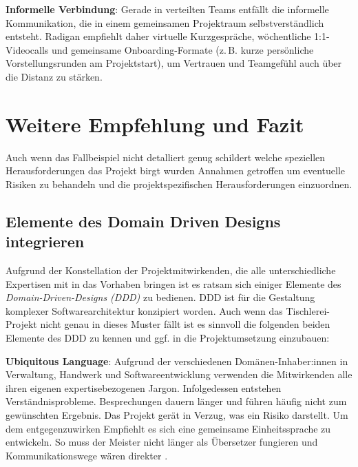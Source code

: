 \documentclass[
    a4paper,
    11pt,
    bibliography=totoc,
    listof=totoc,
    parskip=half,
    headings=normal
]{scrbook}
\begin{document}
\textbf{Informelle Verbindung}: Gerade in verteilten Teams entfällt die
informelle Kommunikation, die in einem gemeinsamen Projektraum selbstverständlich
entsteht. Radigan\autocite{Radigan2023} empfiehlt daher virtuelle Kurzgespräche,
wöchentliche 1:1-Videocalls und gemeinsame Onboarding-Formate (z.\,B. kurze
persönliche Vorstellungsrunden am Projektstart), um Vertrauen und Teamgefühl
auch über die Distanz zu stärken.

\chapter{Weitere Empfehlung und Fazit}


Auch wenn das Fallbeispiel nicht detalliert genug schildert welche speziellen
Herausforderungen das Projekt birgt wurden Annahmen getroffen um eventuelle Risiken
zu behandeln und die projektspezifischen Herausforderungen einzuordnen.

\section{Elemente des Domain Driven Designs integrieren}
Aufgrund der Konstellation der Projektmitwirkenden, die alle unterschiedliche Expertisen
mit in das Vorhaben bringen ist es ratsam sich einiger Elemente des \textit{Domain-Driven-Designs (DDD)}
zu bedienen. DDD ist für die Gestaltung komplexer Softwarearchitektur konzipiert worden. Auch wenn das
Tischlerei-Projekt nicht genau in dieses Muster fällt ist es sinnvoll die folgenden beiden Elemente des DDD zu kennen
und ggf. in die Projektumsetzung einzubauen:

\textbf{Ubiquitous Language}: Aufgrund der verschiedenen Domänen-Inhaber:innen in Verwaltung, Handwerk und
Softwareentwicklung verwenden die Mitwirkenden alle ihren eigenen expertisebezogenen Jargon\autocite[s.][25]{DDDEvans2003}. Infolgedessen entstehen
Verständnisprobleme. Besprechungen dauern länger und führen häufig nicht zum gewünschten Ergebnis. Das Projekt gerät
in Verzug, was ein Risiko darstellt. Um dem entgegenzuwirken Empfiehlt es sich eine gemeinsame Einheitssprache zu
entwickeln. So muss der Meister nicht länger als Übersetzer fungieren und Kommunikationswege wären direkter \autocite[vgl.][Kap.~3. Direkte Kommunikationswege werden ermöglicht und wiederholte Erklärungen ausgeschlossen. Außerdem wird durch eine gemeinsame Sprache ermöglicht die richtige Botschaft zu formulieren.]{Kiefer2010}.
\end{document}
